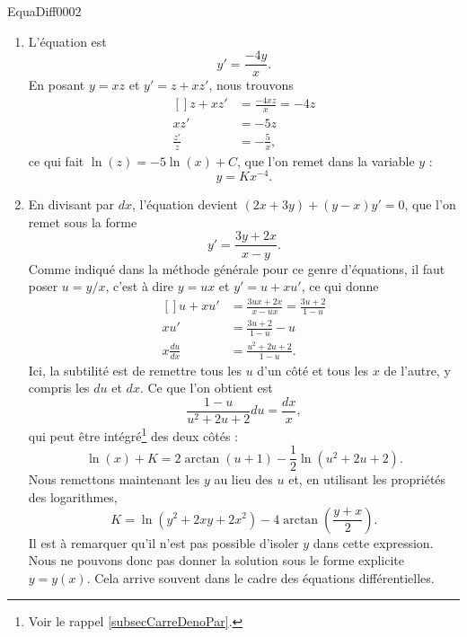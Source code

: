 \begin{corrige}{EquaDiff0002}

\begin{enumerate}

\item
L'équation est
\begin{equation}
	y'=\frac{ -4y }{ x }.
\end{equation}
En posant $y=xz$ et $y'=z+xz'$, nous trouvons
\begin{equation}
	\begin{aligned}[]
		z+xz'&=\frac{ -4xz }{ x }=-4z\\
		xz'&=-5z\\
		\frac{ z' }{ z }&=-\frac{ 5 }{ x },
	\end{aligned}
\end{equation}
ce qui fait $\ln(z)=-5\ln(x)+C$, que l'on remet dans la variable $y$ :
\begin{equation}
	y=Kx^{-4}.
\end{equation}


\item
En divisant par $dx$, l'équation devient $(2x+3y)+(y-x)y'=0$, que l'on remet sous la forme
\begin{equation}
	y'=\frac{ 3y+2x }{ x-y }.
\end{equation}
Comme indiqué dans la méthode générale pour ce genre d'équations, il faut poser $u=y/x$, c'est à dire $y=ux$ et $y'=u+xu'$, ce qui donne
\begin{equation}
	\begin{aligned}[]
		u+xu'&=\frac{ 3ux+2x }{ x-ux }=\frac{ 3u+2 }{ 1-u }\\
		xu'&=\frac{ 3u+2 }{ 1-u }-u\\
		x\frac{ du }{ dx }&=\frac{ u^2+2u+2 }{ 1-u }.
	\end{aligned}
\end{equation}
Ici, la subtilité est de remettre tous les $u$ d'un côté et tous les $x$ de l'autre, y compris les $du$ et $dx$. Ce que l'on obtient est
\begin{equation}
	\frac{ 1-u }{ u^2+2u+2 }du=\frac{ dx }{ x },
\end{equation}
qui peut être intégré\footnote{Voir le rappel \ref{subsecCarreDenoPar}.} des deux côtés :
\begin{equation}
	\ln(x)+K=2\arctan(u+1)-\frac{ 1 }{2}\ln(u^2+2u+2).
\end{equation}
Nous remettons maintenant les $y$ au lieu des $u$ et, en utilisant les propriétés des logarithmes, 
\begin{equation}
	K=\ln(y^2+2xy+2x^2)-4\arctan\left( \frac{ y+x }{ 2 } \right).
\end{equation}
Il est à remarquer qu'il n'est pas possible d'isoler $y$ dans cette expression. Nous ne pouvons donc pas donner la solution sous le forme explicite $y=y(x)$. Cela arrive souvent dans le cadre des équations différentielles.

\end{enumerate}

\end{corrige}
